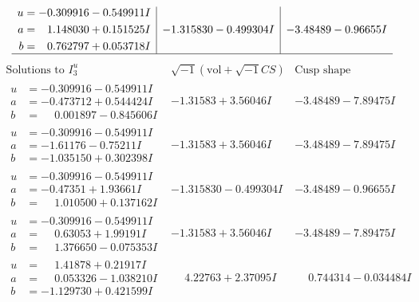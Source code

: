 \documentclass[1p]{elsarticle_modified}
\theoremstyle{definition}
\newcommand{\I}{\sqrt{-1}}
\begin{document}
$$\begin{array}{c|c|c}
\begin{aligned}
u &= -0.309916 - 0.549911 I \\
a &= \phantom{-}1.148030 + 0.151525 I \\
b &= \phantom{-}0.762797 + 0.053718 I\end{aligned}
 & -1.315830 - 0.499304 I & -3.48489 - 0.96655 I\\
 \hline 
 \end{array}$$\newpage$$\begin{array}{c|c|c}  
\text{Solutions to }I^u_{3}& \I (\text{vol} + \sqrt{-1}CS) & \text{Cusp shape}\\
 \hline 
\begin{aligned}
u &= -0.309916 - 0.549911 I \\
a &= -0.473712 + 0.544424 I \\
b &= \phantom{-}0.001897 - 0.845606 I\end{aligned}
 & -1.31583 + 3.56046 I & -3.48489 - 7.89475 I \\ \hline\begin{aligned}
u &= -0.309916 - 0.549911 I \\
a &= -1.61176 - 0.75211 I \\
b &= -1.035150 + 0.302398 I\end{aligned}
 & -1.31583 + 3.56046 I & -3.48489 - 7.89475 I \\ \hline\begin{aligned}
u &= -0.309916 - 0.549911 I \\
a &= -0.47351 + 1.93661 I \\
b &= \phantom{-}1.010500 + 0.137162 I\end{aligned}
 & -1.315830 - 0.499304 I & -3.48489 - 0.96655 I \\ \hline\begin{aligned}
u &= -0.309916 - 0.549911 I \\
a &= \phantom{-}0.63053 + 1.99191 I \\
b &= \phantom{-}1.376650 - 0.075353 I\end{aligned}
 & -1.31583 + 3.56046 I & -3.48489 - 7.89475 I \\ \hline\begin{aligned}
u &= \phantom{-}1.41878 + 0.21917 I \\
a &= \phantom{-}0.053326 - 1.038210 I \\
b &= -1.129730 + 0.421599 I\end{aligned}
 & \phantom{-}4.22763 + 2.37095 I & \phantom{-}0.744314 - 0.034484 I \\ \hline\begin{aligned}

\end{aligned}
\end{array}$$
\end{document}
